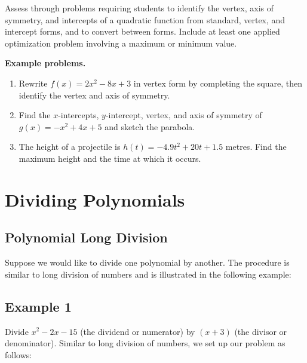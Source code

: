 Assess through problems requiring students to identify the vertex, axis of symmetry, and
intercepts of a quadratic function from standard, vertex, and intercept forms, and to
convert between forms. Include at least one applied optimization problem involving a
maximum or minimum value.

\textbf{Example problems.}

\begin{enumerate}
    \item Rewrite $f(x) = 2x^2 - 8x + 3$ in vertex form by completing the square, then identify the vertex and axis of symmetry.
    \item Find the $x$-intercepts, $y$-intercept, vertex, and axis of symmetry of $g(x) = -x^2 + 4x + 5$ and sketch the parabola.
    \item The height of a projectile is $h(t) = -4.9t^2 + 20t + 1.5$ metres. Find the maximum height and the time at which it occurs.
\end{enumerate}

\section{Dividing Polynomials}
\label{sec:divi-c574}

\subsection{Polynomial Long Division}
\label{sss:poly-7d92}

Suppose we would like to divide one polynomial by another. The procedure is similar to
long division of numbers and is illustrated in the following example:

\subsection{Example 1}
\label{sss:exam-acc3}

Divide $x^2 - 2x - 15$ (the dividend or numerator) by $(x + 3)$ (the divisor or denominator). 
Similar to long division of numbers, we set up our problem as follows:

